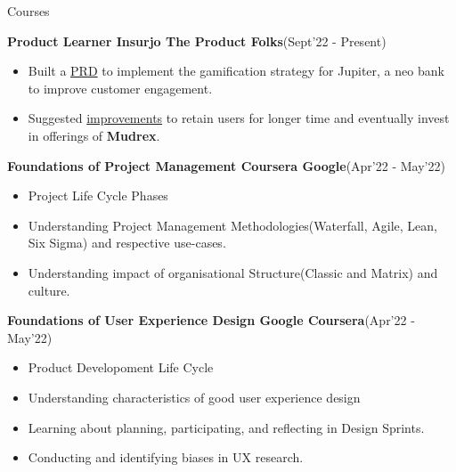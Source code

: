 \begin{rSection}{Courses}
\vspace{-.4cm}

\item{\bf Product Learner Insurjo The Product Folks}\hfill{(Sept'22 - Present)}\\
[-0.4cm]

\begin{itemize}[leftmargin=*]

	\itemsep \sepval

	\item Built a \href{https://drive.google.com/file/d/1u6uiQsXEsm6QAMnPC-vQYK94N5bbqwSt/view?usp=share_link}{PRD} to implement the gamification strategy for Jupiter, a neo bank to improve customer engagement.

	\item Suggested \href{https://drive.google.com/file/d/1XgBXYlvwXj22Xdp10PC8FvQQhP0Q3tq4/view?usp=share_link}{improvements} to retain users for longer time and eventually invest in offerings of {\bf Mudrex}.

\end{itemize}

\vspace{-.2cm}
\item{\bf Foundations of Project Management Coursera Google}\hfill{(Apr'22 - May'22)}\\
[-0.4cm]

\begin{itemize}[leftmargin=*]

	\itemsep \sepval

	\item Project Life Cycle Phases

	\item Understanding Project Management Methodologies(Waterfall, Agile, Lean, Six Sigma) and respective use-cases.

	\item Understanding impact of organisational Structure(Classic and Matrix) and culture.

\end{itemize}

\vspace{-.2cm}
\item{\bf Foundations of User Experience Design Google Coursera}\hfill{(Apr'22 - May'22)}\\
[-0.4cm]

\begin{itemize}[leftmargin=*]

	\itemsep \sepval

	\item Product Developoment Life Cycle

	\item Understanding characteristics of good user experience design

	\item Learning about planning, participating, and reflecting in Design Sprints.

	\item Conducting and identifying biases in UX research.

\end{itemize}

\end{rSection}
